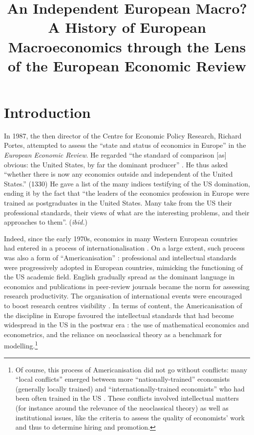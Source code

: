 \documentclass[]{elsarticle} %
\begin{document}
\begin{frontmatter}

  \title{An Independent European Macro? A History of European
Macroeconomics through the Lens of the European Economic Review}
  
  \begin{abstract}
  
  \end{abstract}
  
 \end{frontmatter}

\hypertarget{introduction}{%
\section{Introduction}\label{introduction}}

In 1987, the then director of the Centre for Economic Policy Research,
Richard Portes, attempted to assess the ``state and status of economics
in Europe'' in the \emph{European Economic Review}. He regarded ``the
standard of comparison {[}as{]} obvious: the United States, by far the
dominant producer'' \citep[1329]{portes1987}. He thus asked ``whether
there is now any economics outside and independent of the United
States.'' (1330) He gave a list of the many indices testifying of the US
domination, ending it by the fact that ``the leaders of the economics
profession in Europe were trained as postgraduates in the United States.
Many take from the US their professional standards, their views of what
are the interesting problems, and their approaches to them''.
(\emph{ibid.})

Indeed, since the early 1970s, economics in many Western European
countries had entered in a process of internationalisation
\citep[chapters 3 and 4]{fourcade2006, fourcade2009}. On a large extent,
such process was also a form of ``Americanisation''
\citep{coats1996, goutsmedt2021}: professional and intellectual
standards were progressively adopted in European countries, mimicking
the functioning of the US academic field. English gradually spread as
the dominant language in economics \citep{sandelin1997} and publications
in peer-review journals became the norm for assessing research
productivity. The organisation of international events were encouraged
to boost research centres visibility \citep{goutsmedt2021}. In terms of
content, the Americanisation of the discipline in Europe favoured the
intellectual standards that had become widespread in the US in the
postwar era \citep{morgan1998}: the use of mathematical economics and
econometrics, and the reliance on neoclassical theory as a benchmark for
modelling.\footnote{Of course, this process of Americanisation did not
  go without conflicts: many ``local conflicts'' emerged between more
  ``nationally-trained'' economists (generally locally trained) and
  ``internationally-trained economists'' who had been often trained in
  the US \citep{fourcade2006}. These conflicts involved intellectual
  matters (for instance around the relevance of the neoclassical theory)
  as well as institutional issues, like the criteria to assess the
  quality of economists' work and thus to determine hiring and
  promotion.}
\end{document}
